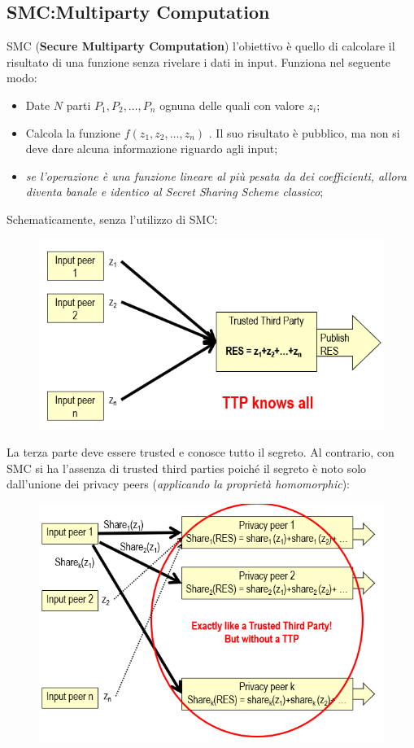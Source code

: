 \documentclass{book}
\begin{document}
\subsection{SMC:\@Secure Multiparty Computation}
SMC (\textbf{Secure Multiparty Computation}) l'obiettivo è quello di calcolare il risultato di una funzione senza rivelare i dati in input\@. Funziona nel seguente modo:
\begin{itemize}
    \item Date \(N\) parti \(P_{1},P_{2},\dots,P_{n}\) ognuna delle quali con valore \(z_{i}\);
    \item Calcola la funzione \(f(z_{1},z_{2},\dots,z_{n})\) \@. Il suo risultato è pubblico, ma non si deve dare alcuna informazione riguardo agli input;
    \item \emph{se l'operazione è una funzione lineare al più pesata da dei coefficienti, allora diventa banale e identico al Secret Sharing Scheme classico};
\end{itemize}
Schematicamente, senza l'utilizzo di SMC:\@
\begin{figure}[h]
    \centering
    \includegraphics[scale=0.5]{2021-12-29-23-00-13.png}%
\end{figure}
La terza parte deve essere trusted e conosce tutto il segreto\@.\newpage
Al contrario, con SMC si ha l'assenza di trusted third parties poiché il segreto è noto solo dall'unione dei privacy peers (\emph{applicando la proprietà homomorphic}):
\begin{figure}[h]
    \begin{center}
        \includegraphics[scale=0.4]{2021-12-29-23-03-44.png}%
    \end{center}
\end{figure}
\end{document}
